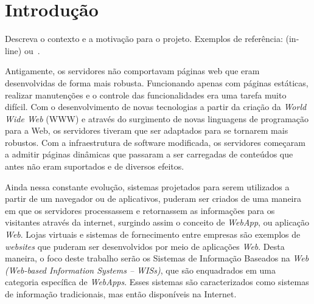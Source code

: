 
\section{Introdução}
\label{sec-intro}

Descreva o contexto e a motivação para o projeto. Exemplos de referência:  (in-line) ou~\cite{guarino-et-al:hobook09}.

Antigamente, os servidores não comportavam páginas web que eram desenvolvidas de forma mais robusta. Funcionando apenas com páginas estáticas, realizar manutenções e o controle das funcionalidades era uma tarefa muito difícil. Com o desenvolvimento de novas tecnologias a partir da criação da \textit{World Wide Web} (WWW) e através do surgimento de novas linguagens de programação para a Web, os servidores tiveram que ser adaptados para se tornarem mais robustos. Com a infraestrutura de software modificada, os servidores começaram a admitir páginas dinâmicas que passaram a ser carregadas de conteúdos que antes não eram suportados e de diversos efeitos.

Ainda nessa constante evolução, sistemas projetados para serem utilizados a partir de um navegador ou de aplicativos, puderam ser criados de uma maneira em que os servidores processassem e retornassem as informações para os visitantes através da internet, surgindo assim o conceito de \textit{WebApp}, ou aplicação \textit{Web}. Lojas virtuais e sistemas de fornecimento entre empresas são exemplos de \textit{websites} que puderam ser desenvolvidos por meio de aplicações \textit{Web}. Desta maneira, o foco deste trabalho serão os Sistemas de Informação Baseados na \textit{Web (Web-based Information Systems – WISs)}, que são enquadrados em uma categoria específica de \textit{WebApps}. Esses sistemas são caracterizados como sistemas de informação tradicionais, mas então disponíveis na Internet. 